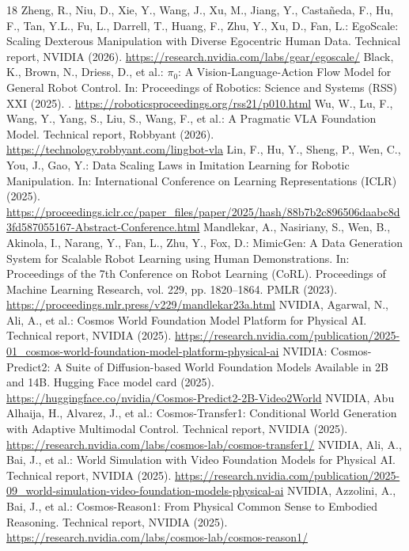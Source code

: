 \documentclass[runningheads]{llncs}
\begin{document}
\begin{thebibliography}{18}
 Zheng, R., Niu, D., Xie, Y., Wang, J., Xu, M., Jiang, Y., Casta\~neda, F., Hu, F., Tan, Y.L., Fu, L., Darrell, T., Huang, F., Zhu, Y., Xu, D., Fan, L.: EgoScale: Scaling Dexterous Manipulation with Diverse Egocentric Human Data. Technical report, NVIDIA (2026). \url{https://research.nvidia.com/labs/gear/egoscale/}
 Black, K., Brown, N., Driess, D., et al.: $\pi_0$: A Vision-Language-Action Flow Model for General Robot Control. In: Proceedings of Robotics: Science and Systems (RSS) XXI (2025). . \url{https://roboticsproceedings.org/rss21/p010.html}
 Wu, W., Lu, F., Wang, Y., Yang, S., Liu, S., Wang, F., et al.: A Pragmatic VLA Foundation Model. Technical report, Robbyant (2026). \url{https://technology.robbyant.com/lingbot-vla}
 Lin, F., Hu, Y., Sheng, P., Wen, C., You, J., Gao, Y.: Data Scaling Laws in Imitation Learning for Robotic Manipulation. In: International Conference on Learning Representations (ICLR) (2025). \url{https://proceedings.iclr.cc/paper_files/paper/2025/hash/88b7b2c896506daabc8d3fd587055167-Abstract-Conference.html}
 Mandlekar, A., Nasiriany, S., Wen, B., Akinola, I., Narang, Y., Fan, L., Zhu, Y., Fox, D.: MimicGen: A Data Generation System for Scalable Robot Learning using Human Demonstrations. In: Proceedings of the 7th Conference on Robot Learning (CoRL). Proceedings of Machine Learning Research, vol. 229, pp. 1820--1864. PMLR (2023). \url{https://proceedings.mlr.press/v229/mandlekar23a.html}
 NVIDIA, Agarwal, N., Ali, A., et al.: Cosmos World Foundation Model Platform for Physical AI. Technical report, NVIDIA (2025). \url{https://research.nvidia.com/publication/2025-01_cosmos-world-foundation-model-platform-physical-ai}
 NVIDIA: Cosmos-Predict2: A Suite of Diffusion-based World Foundation Models Available in 2B and 14B. Hugging Face model card (2025). \url{https://huggingface.co/nvidia/Cosmos-Predict2-2B-Video2World}
 NVIDIA, Abu Alhaija, H., Alvarez, J., et al.: Cosmos-Transfer1: Conditional World Generation with Adaptive Multimodal Control. Technical report, NVIDIA (2025). \url{https://research.nvidia.com/labs/cosmos-lab/cosmos-transfer1/}
 NVIDIA, Ali, A., Bai, J., et al.: World Simulation with Video Foundation Models for Physical AI. Technical report, NVIDIA (2025). \url{https://research.nvidia.com/publication/2025-09_world-simulation-video-foundation-models-physical-ai}
 NVIDIA, Azzolini, A., Bai, J., et al.: Cosmos-Reason1: From Physical Common Sense to Embodied Reasoning. Technical report, NVIDIA (2025). \url{https://research.nvidia.com/labs/cosmos-lab/cosmos-reason1/}

\end{thebibliography}
\end{document}
